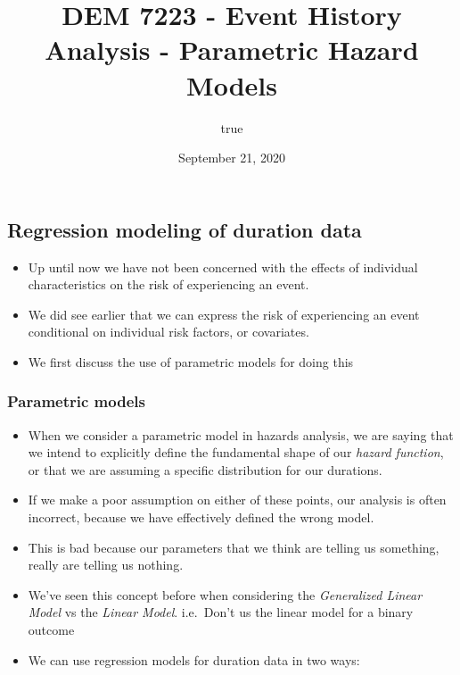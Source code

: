 \documentclass[
]{article}
\title{DEM 7223 - Event History Analysis - Parametric Hazard Models}
\author{true}
\date{September 21, 2020}
\begin{document}
\maketitle

{
\setcounter{tocdepth}{2}
\tableofcontents
}
\hypertarget{regression-modeling-of-duration-data}{%
\subsection{Regression modeling of duration
data}\label{regression-modeling-of-duration-data}}

\begin{itemize}
\item
  Up until now we have not been concerned with the effects of individual
  characteristics on the risk of experiencing an event.
\item
  We did see earlier that we can express the risk of experiencing an
  event conditional on individual risk factors, or covariates.
\item
  We first discuss the use of parametric models for doing this
\end{itemize}

\hypertarget{parametric-models}{%
\subsubsection{Parametric models}\label{parametric-models}}

\begin{itemize}
\item
  When we consider a parametric model in hazards analysis, we are saying
  that we intend to explicitly define the fundamental shape of our
  \emph{hazard function}, or that we are assuming a specific
  distribution for our durations.
\item
  If we make a poor assumption on either of these points, our analysis
  is often incorrect, because we have effectively defined the wrong
  model.
\item
  This is bad because our parameters that we think are telling us
  something, really are telling us nothing.
\item
  We've seen this concept before when considering the \emph{Generalized
  Linear Model} vs the \emph{Linear Model}. i.e.~Don't us the linear
  model for a binary outcome
\item
  We can use regression models for duration data in two ways:
\end{itemize}
\end{document}
